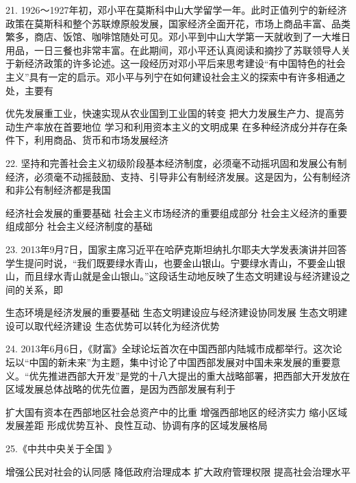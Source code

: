 21. 1926～1927年初，邓小平在莫斯科中山大学留学一年。此时正值列宁的新经济政策在莫斯科和整个苏联燎原般发展，国家经济全面开花，市场上商品丰富、品类繁多，商店、饭馆、咖啡馆随处可见。邓小平到中山大学第一天就收到了一大堆日用品，一日三餐也非常丰富。在此期间，邓小平还认真阅读和摘抄了苏联领导人关于新经济政策的许多论述。这一段经历对邓小平后来思考建设“有中国特色的社会主义”具有一定的启示。邓小平与列宁在如何建设社会主义的探索中有许多相通之处，主要有
\begin{choices}
	  优先发展重工业，快速实现从农业国到工业国的转变
	  把大力发展生产力、提高劳动生产率放在首要地位
	  学习和利用资本主义的文明成果
	  在多种经济成分并存在条件下，利用商品、货币和市场发展经济
\end{choices}

22. 坚持和完善社会主义初级阶段基本经济制度，必须毫不动摇巩固和发展公有制经济，必须毫不动摇鼓励、支持、引导非公有制经济发展。这是因为，公有制经济和非公有制经济都是我国
\begin{choices}
	  经济社会发展的重要基础
	  社会主义市场经济的重要组成部分
	  社会主义经济的重要组成部分
	  社会主义经济制度的基础
\end{choices}

23. 2013年9月7日，国家主席习近平在哈萨克斯坦纳扎尔耶夫大学发表演讲并回答学生提问时说，“我们既要绿水青山，也要金山银山。宁要绿水青山，不要金山银山，而且绿水青山就是金山银山。”这段话生动地反映了生态文明建设与经济建设之间的关系，即
\begin{choices}
	  生态环境是经济发展的重要基础
	  生态文明建设应与经济建设协同发展
	  生态文明建设可以取代经济建设
	  生态优势可以转化为经济优势
\end{choices}

24. 2013年6月6日，《财富》全球论坛首次在中国西部内陆城市成都举行。这次论坛以“中国的新未来”为主题，集中讨论了中国西部发展对中国未来发展的重要意义。“优先推进西部大开发”是党的十八大提出的重大战略部署，把西部大开发放在区域发展总体战略的优先位置，是因为西部发展有利于
\begin{choices}
	  扩大国有资本在西部地区社会总资产中的比重
	  增强西部地区的经济实力
	  缩小区域发展差距
	  形成优势互补、良性互动、协调有序的区域发展格局
\end{choices}

 25.《中共中央关于全国 》
\begin{choices}
	  增强公民对社会的认同感
	  降低政府治理成本
	  扩大政府管理权限
	  提高社会治理水平
\end{choices}

